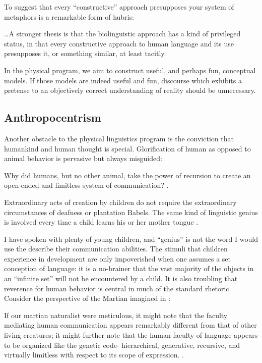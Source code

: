 To suggest that every “constructive” approach presupposes your system of metaphors is a remarkable form of hubris:

…A stronger thesis is that the biolinguistic approach has a kind of privileged status, in that every constructive approach to human language and its use presupposes it, or something similar, at least tacitly. \citep{Chomsky2001a}

  In the physical program, we aim to construct useful, and perhaps fun, conceptual models. If those models are indeed useful and fun, discourse which exhibits a pretense to an objectively correct understanding of reality should be unnecessary.

\subsection{Anthropocentrism}

Another obstacle to the physical linguistics program is the conviction that humankind and human thought is special. Glorification of human as opposed to animal behavior is pervasive but always misguided:

Why did humans, but no other animal, take the power of recursion to create an open-ended and limitless system of communication? \citep{HauserEtAl2002}.

Extraordinary acts of creation by children do not require the extraordinary circumstances of deafness or plantation Babels. The same kind of linguistic genius is involved every time a child learns his or her mother tongue \citep{Pinker2003}.

  I have spoken with plenty of young children, and “genius” is not the word I would use the describe their communication abilities. The stimuli that children experience in development are only impoverished when one assumes a set conception of language: it is a no-brainer that the vast majority of the objects in an “infinite set” will not be encountered by a child. It is also troubling that reverence for human behavior is central in much of the standard rhetoric. Consider the perspective of the Martian imagined in \citet{HauserEtAl2002}:

If our martian naturalist were meticulous, it might note that the faculty mediating human communication appears remarkably different from that of other living creatures; it might further note that the human faculty of language appears to be organized like the genetic code- hierarchical, generative, recursive, and virtually limitless with respect to its scope of expression. \citep{HauserEtAl2002}.

